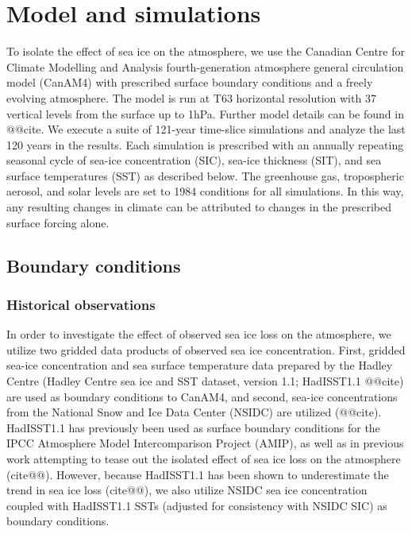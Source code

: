 \documentclass[twocol]{ametsoc}
\begin{document}
\section{Model and simulations}

To isolate the effect of sea ice on the atmosphere, we use the Canadian Centre for Climate Modelling and Analysis fourth-generation atmosphere general circulation model (CanAM4) with prescribed surface boundary conditions and a freely evolving atmosphere. The model is run at T63 horizontal resolution with 37 vertical levels from the surface up to 1hPa. Further model details can be found in @@cite. We execute a suite of 121-year time-slice simulations and analyze the last 120 years in the results. Each simulation is prescribed with an annually repeating seasonal cycle of sea-ice concentration (SIC), sea-ice thickness (SIT), and sea surface temperatures (SST) as described below. The greenhouse gas, tropospheric aerosol, and solar levels are set to 1984 conditions for all simulations. In this way, any resulting changes in climate can be attributed to changes in the prescribed surface forcing alone.

\subsection{Boundary conditions}
\subsubsection{Historical observations}

In order to investigate the effect of observed sea ice loss on the atmosphere, we utilize two gridded data products of observed sea ice concentration. First, gridded sea-ice concentration and sea surface temperature data prepared by the Hadley Centre (Hadley Centre sea ice and SST dataset, version 1.1; HadISST1.1 @@cite) are used as boundary conditions to CanAM4, and second, sea-ice concentrations from the National Snow and Ice Data Center (NSIDC) are utilized (@@cite). HadISST1.1 has previously been used as surface boundary conditions for the IPCC Atmosphere Model Intercomparison Project (AMIP), as well as in previous work attempting to tease out the isolated effect of sea ice loss on the atmosphere (cite@@). However, because HadISST1.1 has been shown to underestimate the trend in sea ice loss (cite@@), we also utilize NSIDC sea ice concentration coupled with HadISST1.1 SSTs (adjusted for consistency with NSIDC SIC) as boundary conditions.
\end{document}
